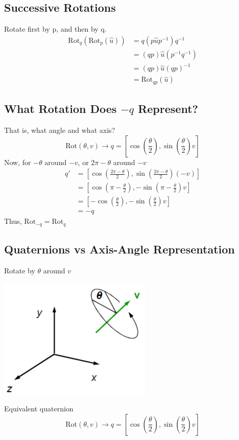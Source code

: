 \documentclass{article}
\begin{document}
\subsection*{Successive Rotations}
Rotate first by p, and then by q.
\begin{align*}
    \text{Rot}_q(\text{Rot}_p(\hat u)) &= q(p\hat u p^{-1})q^{-1}\\
    &=(qp)\hat u(p^{-1} q^{-1}) \\
    &=(qp) \hat u (qp)^{-1} \\
    &= \text{Rot}_{qp}(\hat u)
\end{align*}

\subsection*{What Rotation Does $-q$ Represent?}
That is, what angle and what axis?
\[\text{Rot}(\theta, v) \rightarrow q = [\cos(\frac{\theta}{2}), \sin(\frac{\theta}{2})v]\]
Now, for $-\theta$ around $-v$, or $2\pi - \theta$ around $-v$
\begin{align*}
    q' &= [\cos(\frac{2\pi - \theta}{2}), \sin(\frac{2\pi - \theta}{2})(-v)]\\
    &= [\cos(\pi - \frac{\theta}{2}), -\sin(\pi - \frac{\theta}{2})v]\\
    &= [-\cos(\frac{\theta}{2}), -\sin(\frac{\theta}{2})v]\\
    &= -q
\end{align*}
Thus, $\text{Rot}_{-q} = \text{Rot}_q$

\subsection*{Quaternions vs Axis-Angle Representation}
Rotate by $\theta$ around $v$
\begin{center}
    \includegraphics*[scale=1]{W2_7.png}
\end{center}
Equivalent quaternion
\[\text{Rot}(\theta, v) \rightarrow q = [\cos(\frac{\theta}{2}), \sin(\frac{\theta}{2})v]\]
\end{document}

